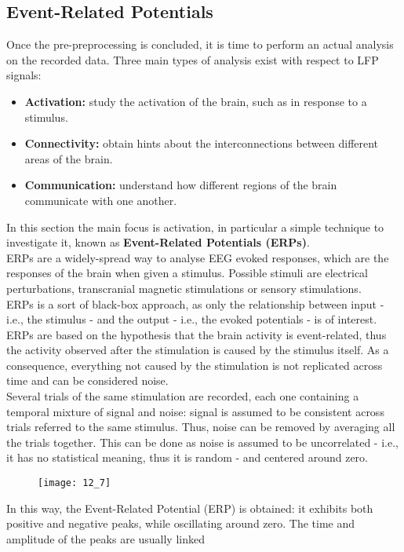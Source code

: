 \subsection{Event-Related Potentials}
Once the pre-preprocessing is concluded, it is time to perform an actual analysis on the
recorded data. Three main types of analysis exist with respect to LFP signals:
\begin{itemize}
    \item \textbf{Activation:} study the activation of the brain, such as in response to a stimulus.
    \item \textbf{Connectivity:} obtain hints about the interconnections between different
          areas of the brain.
    \item \textbf{Communication:} understand how different regions of the brain communicate
          with one another.
\end{itemize}
In this section the main focus is activation, in particular a simple technique to investigate
it, known as \textbf{Event-Related Potentials (ERPs)}.\\
ERPs are a widely-spread way to analyse EEG evoked responses, which are the responses of the brain
when given a stimulus. Possible stimuli are electrical perturbations, transcranial magnetic stimulations
or sensory stimulations.\\
ERPs is a sort of black-box approach, as only the relationship between
input - i.e., the stimulus - and the output - i.e., the evoked potentials - is of interest.
ERPs are based on the hypothesis that the brain activity is event-related, thus the activity
observed after the stimulation is caused by the stimulus itself. As a consequence, everything
not caused by the stimulation is not replicated across time and can be considered noise.\\
Several trials of the same stimulation are recorded, each one containing a temporal mixture
of signal and noise: signal is assumed to be consistent across trials referred to the same
stimulus. Thus, noise can be removed by averaging all the trials together. This can be done
as noise is assumed to be uncorrelated - i.e., it has no statistical meaning, thus it is random -
and centered around zero.
\begin{figure}[H]
    \centering
    \texttt{[image: 12\_7]}
\end{figure}
In this way, the Event-Related Potential (ERP) is obtained: it exhibits both positive and negative
peaks, while oscillating around zero. The time and amplitude of the peaks are usually linked
